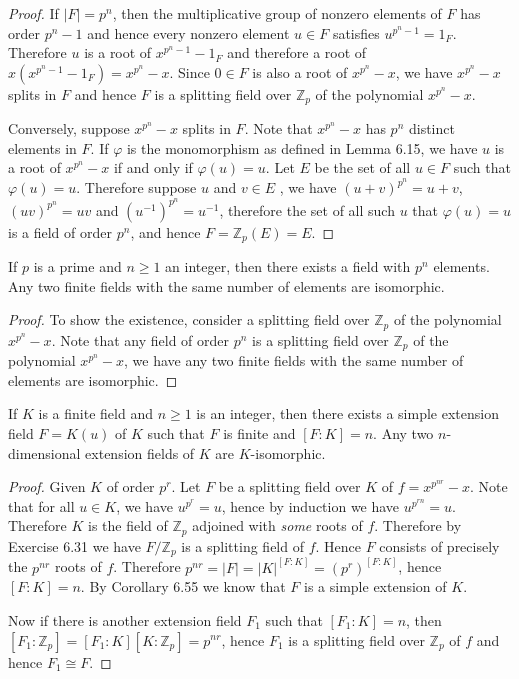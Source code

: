 \begin{proof}
If $|F|=p^n$, then the multiplicative group of nonzero elements of $F$ has order $p^n-1$ and hence every nonzero element $u\in F$ satisfies $u^{p^n-1}=1_F$. Therefore $u$ is a root of $x^{p^n-1}-1_F$ and therefore a root of $x(x^{p^n-1}-1_F)=x^{p^n}-x$. Since $0\in F$ is also a root of $x^{p^n}-x$, we have $x^{p^n}-x$ splits in $F$ and hence $F$ is a splitting field over $\mathbb{Z}_p$ of the polynomial $x^{p^n}-x$.\par
Conversely, suppose $x^{p^n}-x$ splits in $F$. Note that $x^{p^n}-x$ has $p^n$ distinct elements in $F$. If $\varphi$ is the monomorphism as defined in Lemma 6.15, we have $u$ is a root of $x^{p^n}-x$ if and only if $\varphi(u)=u$. Let $E$ be the set of all $u\in F$ such that $\varphi(u)=u$. Therefore suppose $u$ and $v\in E$ , we have $(u+v)^{p^n}=u+v$, $(uv)^{p^n}=uv$ and $(u^{-1})^{p^n}=u^{-1}$, therefore the set of all such $u$ that $\varphi(u)=u$ is a field of order $p^n$, and hence $F=\mathbb{Z}_p(E)=E$.
\end{proof}
\begin{corollary}
If $p$ is a prime and $n\ge 1$ an integer, then there exists a field with $p^n$ elements. Any two finite fields with the same number of elements are isomorphic.
\end{corollary}
\begin{proof}
To show the existence, consider a splitting field over $\mathbb{Z}_p$ of the polynomial $x^{p^n}-x$. Note that any field of order $p^n$ is a splitting field over $\mathbb{Z}_p$ of the polynomial $x^{p^n}-x$, we have any two finite fields with the same number of elements are isomorphic.
\end{proof}
\begin{corollary}
If $K$ is a finite field and $n\ge 1$ is an integer, then there exists a simple extension field $F=K(u)$ of $K$ such that $F$ is finite and $[F:K]=n$. Any two $n$-dimensional extension fields of $K$ are $K$-isomorphic.
\end{corollary}
\begin{proof}
Given $K$ of order $p^r$. Let $F$ be a splitting field over $K$ of $f=x^{p^{nr}}-x$. Note that for all $u\in K$, we have $u^{p^r}=u$, hence by induction we have $u^{p^{rn}}=u$. Therefore $K$ is the field of $\mathbb{Z}_p$ adjoined with \textit{some} roots of $f$. Therefore by Exercise 6.31 we have $F/\mathbb{Z}_p$ is a splitting field of $f$. Hence $F$ consists of precisely the $p^{nr}$ roots of $f$. Therefore $p^{nr}=\left| F \right|=\left| K \right|^{\left[ F:K \right]}=\left( p^r \right) ^{\left[ F:K \right]}$, hence $[F:K]=n$. By Corollary 6.55 we know that $F$ is a simple extension of $K$.\par
Now if there is another extension field $F_1$ such that $[F_1:K]=n$, then $[F_1:\mathbb{Z}_p]=[F_1:K][K:\mathbb{Z}_p]=p^{nr}$, hence $F_1$ is a splitting field over $\mathbb{Z}_p$ of $f$ and hence $F_1\cong F$.
\end{proof}
